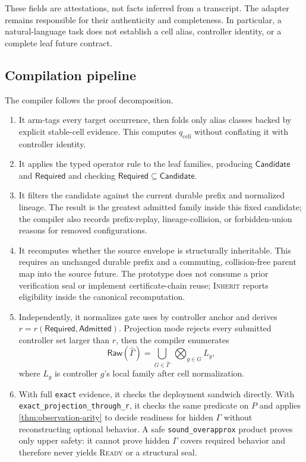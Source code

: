 These fields are attestations, not facts inferred from a transcript.
The adapter remains responsible for their authenticity and completeness.
In particular, a natural-language task does not establish a cell alias,
controller identity, or a complete leaf future contract.

\subsection{Compilation pipeline}

The compiler follows the proof decomposition.

\begin{enumerate}[leftmargin=*,itemsep=2pt]
  \item It arm-tags every target occurrence, then folds only alias classes
  backed by explicit stable-cell evidence.  This computes
  $q_{\mathrm{cell}}$ without conflating it with controller identity.

  \item It applies the typed operator rule to the leaf families, producing
  $\mathsf{Candidate}$ and $\mathsf{Required}$ and checking
  $\mathsf{Required}\subseteq\mathsf{Candidate}$.

  \item It filters the candidate against the current durable prefix and
  normalized lineage.  The result is the greatest admitted family inside this
  fixed candidate; the compiler also records prefix-replay, lineage-collision,
  or forbidden-union reasons for removed configurations.

  \item It recomputes whether the source envelope is structurally inheritable.
  This requires an unchanged durable prefix and a commuting, collision-free
  parent map into the source future.  The prototype does not consume a prior
  verification seal or implement certificate-chain reuse; \textsc{Inherit}
  reports eligibility inside the canonical recomputation.

  \item Independently, it normalizes gate uses by controller anchor and derives
  $r=r(\mathsf{Required},\mathsf{Admitted})$.  Projection mode rejects every
  submitted controller set larger than $r$, then the compiler enumerates
  \[
    \mathsf{Raw}(\widehat\Gamma)
      =\bigcup_{G\in\widehat\Gamma}\ \bigotimes_{g\in G} L_g,
  \]
  where $L_g$ is controller $g$'s local family after cell normalization.

  \item With full \texttt{exact} evidence, it checks the deployment sandwich
  directly.  With \texttt{exact\_projection\_through\_r}, it checks the same
  predicate on $P$ and applies \cref{thm:observation-arity} to decide readiness
  for hidden $\Gamma$ without reconstructing optional behavior.  A safe
  \texttt{sound\_overapprox} product proves only upper safety: it cannot prove
  hidden $\Gamma$ covers required behavior and therefore never yields
  \textsc{Ready} or a structural seal.
\end{enumerate}

